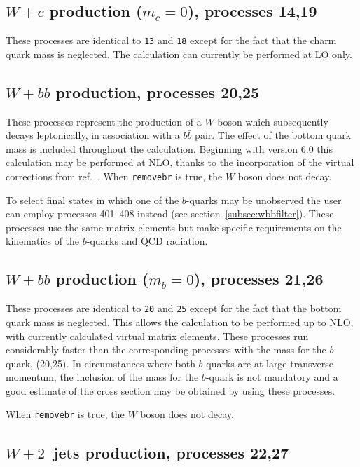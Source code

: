 \documentclass{article}
\begin{document}
\subsection{$W+c$ production ($m_c=0$), processes 14,19}
\label{subsec:wcmassless}

These processes are identical to {\tt 13} and {\tt 18} except for the fact
that the charm quark mass is neglected. The calculation can currently be
performed at LO only.

\subsection{$W+b{\bar b}$ production, processes 20,25}
\label{subsec:wbb}

These processes represent the production of a $W$ boson which subsequently
decays leptonically, in association with a $b{\bar b}$ pair. The effect of
the bottom quark mass is included throughout the calculation.  
Beginning with \MCFM version 6.0 this calculation may be performed at NLO, thanks to
the incorporation of the virtual corrections from ref.~\cite{Badger:2010mg}.
When {\tt removebr} is true, the $W$ boson does not decay.

To select final states in which one of the $b$-quarks may be unobserved the
user can employ processes 401--408 instead (see section~\ref{subsec:wbbfilter}).
These processes use the same matrix
elements but make specific requirements on the kinematics of the $b$-quarks
and QCD radiation. 

\subsection{$W+b{\bar b}$ production ($m_b=0$), processes 21,26}
\label{subsec:wbbmassless}

These processes are identical to {\tt 20} and {\tt 25} except for the fact
that the bottom quark mass is neglected. This allows the calculation to be
performed up to NLO, with currently calculated virtual matrix elements. These 
processes run considerably faster than the corresponding processes with the mass
for the $b$ quark, (20,25). In circumstances where both $b$ quarks are at large 
transverse momentum, the inclusion of the mass for the $b$-quark is not mandatory
and a good estimate of the cross section may be obtained by using these processes.

When {\tt removebr} is true, the $W$ boson does not decay.

\subsection{$W+2$~jets production, processes 22,27}
\label{subsec:w2jets}
\end{document}
